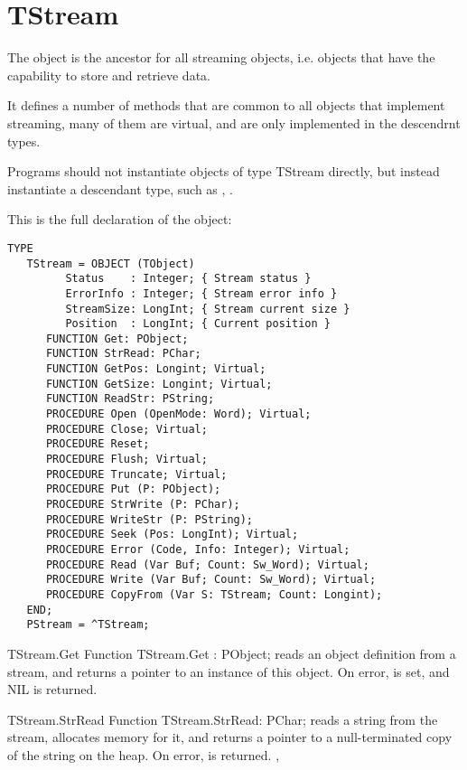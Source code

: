\section{TStream}
\label{se:TStream}

The  object is the ancestor for all streaming objects, i.e.
objects that have the capability to store and retrieve data.

It defines a number of methods that are common to all objects that implement
streaming, many of them are virtual, and are only implemented in the
descendrnt types.

Programs should not instantiate objects of type TStream directly, but
instead instantiate a descendant type, such as ,
.

This is the full declaration of the  object:
\begin{verbatim}
TYPE
   TStream = OBJECT (TObject)
         Status    : Integer; { Stream status }
         ErrorInfo : Integer; { Stream error info }
         StreamSize: LongInt; { Stream current size }
         Position  : LongInt; { Current position }
      FUNCTION Get: PObject;
      FUNCTION StrRead: PChar;
      FUNCTION GetPos: Longint; Virtual;
      FUNCTION GetSize: Longint; Virtual;
      FUNCTION ReadStr: PString;
      PROCEDURE Open (OpenMode: Word); Virtual;
      PROCEDURE Close; Virtual;
      PROCEDURE Reset;
      PROCEDURE Flush; Virtual;
      PROCEDURE Truncate; Virtual;
      PROCEDURE Put (P: PObject);
      PROCEDURE StrWrite (P: PChar);
      PROCEDURE WriteStr (P: PString);
      PROCEDURE Seek (Pos: LongInt); Virtual;
      PROCEDURE Error (Code, Info: Integer); Virtual;
      PROCEDURE Read (Var Buf; Count: Sw_Word); Virtual;
      PROCEDURE Write (Var Buf; Count: Sw_Word); Virtual;
      PROCEDURE CopyFrom (Var S: TStream; Count: Longint);
   END;
   PStream = ^TStream;
\end{verbatim}

\begin{function}{TStream.Get}
\Declaration
Function TStream.Get : PObject;
\Description
{} reads an object definition  from a stream, and returns
a pointer to an instance of this object.
\Errors
On error,  is set, and NIL is returned.
\SeeAlso 
{}
\end{function}

\begin{function}{TStream.StrRead}
\Declaration
Function TStream.StrRead: PChar;
\Description
{} reads a string from the stream, allocates memory
for it, and returns a pointer to a null-terminated copy of the string
on the heap.
\Errors
On error,  is returned.
\SeeAlso
{}, 
\end{function}

